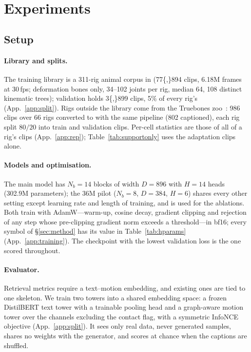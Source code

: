 \section{Experiments}\label{sec:exp}

\subsection{Setup}\label{sec:exp:setup}

\paragraph{Library and splits.} The training library is a \num{311}-rig animal corpus in \rep{}
(\num{77{,}894} clips, \num{6.18}M frames at 30\,fps; deformation bones only, 34--102 joints per rig, median 64,
\num{108} distinct kinematic trees); validation holds \num{3{,}899} clips, \num{5}\% of every rig's
(App.~\ref{app:split}). Rigs outside the library come from
the Truebones zoo~\citep{truebones}: \num{986} clips over \num{66} rigs converted to \rep{} with the same
pipeline (\num{802} captioned), each rig split $80/20$ into train and validation clips. Per-cell statistics are
those of all of a rig's clips (App.~\ref{app:rep}); Table~\ref{tab:supportonly} uses the adaptation clips alone.

\paragraph{Models and optimisation.} The main model has $N_b{=}14$ blocks of width $D{=}896$ with $H{=}14$
heads (\num{302.9}M parameters); the \num{36}M pilot ($N_b{=}8$, $D{=}384$, $H{=}6$) shares every other setting
except learning rate and length of training, and is used for the ablations. Both train with AdamW---warm-up,
cosine decay, gradient clipping and rejection of any step whose pre-clipping gradient norm exceeds a
threshold---in bf16; every symbol of \S\ref{sec:method} has its value in Table~\ref{tab:hparams}
(App.~\ref{app:training}). The checkpoint with the lowest validation loss is the one scored throughout.


\paragraph{Evaluator.} Retrieval metrics require a text--motion embedding, and existing ones are tied to one
skeleton. We train two towers into a shared embedding space: a frozen DistilBERT text tower with a trainable
pooling head and a graph-aware motion tower over the \rep{} channels excluding the contact flag, with a symmetric
InfoNCE objective (App.~\ref{app:split}). It sees only real data, never generated samples, shares no weights with
the generator, and scores at chance when the captions are shuffled.

